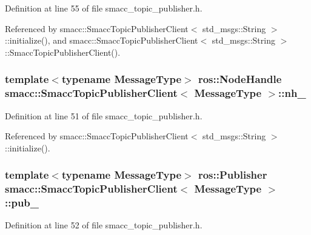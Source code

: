 Definition at line 55 of file smacc\+\_\+topic\+\_\+publisher.\+h.



Referenced by smacc\+::\+Smacc\+Topic\+Publisher\+Client$<$ std\+\_\+msgs\+::\+String $>$\+::initialize(), and smacc\+::\+Smacc\+Topic\+Publisher\+Client$<$ std\+\_\+msgs\+::\+String $>$\+::\+Smacc\+Topic\+Publisher\+Client().

\subsubsection[{\texorpdfstring{nh\+\_\+}{nh_}}]{\setlength{\rightskip}{0pt plus 5cm}template$<$typename Message\+Type$>$ ros\+::\+Node\+Handle {\bf smacc\+::\+Smacc\+Topic\+Publisher\+Client}$<$ Message\+Type $>$\+::nh\+\_\+\hspace{0.3cm}{\ttfamily [protected]}}\hypertarget{classsmacc_1_1SmaccTopicPublisherClient_a2b238fd801e0a088ee4a7da76fef1e70}{}\label{classsmacc_1_1SmaccTopicPublisherClient_a2b238fd801e0a088ee4a7da76fef1e70}


Definition at line 51 of file smacc\+\_\+topic\+\_\+publisher.\+h.



Referenced by smacc\+::\+Smacc\+Topic\+Publisher\+Client$<$ std\+\_\+msgs\+::\+String $>$\+::initialize().

\subsubsection[{\texorpdfstring{pub\+\_\+}{pub_}}]{\setlength{\rightskip}{0pt plus 5cm}template$<$typename Message\+Type$>$ ros\+::\+Publisher {\bf smacc\+::\+Smacc\+Topic\+Publisher\+Client}$<$ Message\+Type $>$\+::pub\+\_\+\hspace{0.3cm}{\ttfamily [protected]}}\hypertarget{classsmacc_1_1SmaccTopicPublisherClient_a29d9f2055484e74922c65f0c036e1e31}{}\label{classsmacc_1_1SmaccTopicPublisherClient_a29d9f2055484e74922c65f0c036e1e31}


Definition at line 52 of file smacc\+\_\+topic\+\_\+publisher.\+h.



